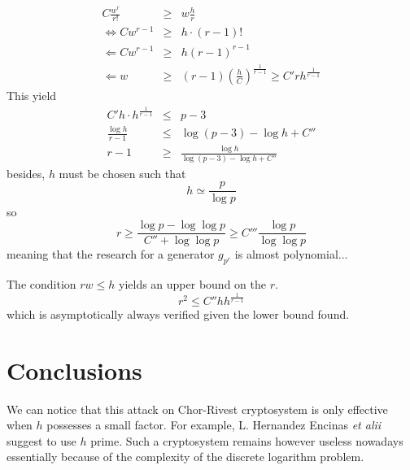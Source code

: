 \documentclass[12pt,a4paper,titlepage]{article}
\begin{document}
\begin{eqnarray*}
C\frac{w^r}{r!} &\geq& w \frac{h}{r} \\
\Leftrightarrow C w^{r-1} &\geq& h\cdot (r-1)! \\
\Leftarrow C w^{r-1} &\geq& h (r-1)^{r-1} \\
\Leftarrow w &\geq& (r-1) \left(\frac{h}{C}\right)^{\frac{1}{r-1}} \geq C' r h^{\frac{1}{r-1}}
\end{eqnarray*}
This yield
\begin{eqnarray*}
C' h \cdot h^{\frac{1}{r-1}} &\leq& p-3 \\
\frac{\log h}{r-1} &\leq& \log (p-3) - \log h + C'' \\
r-1 &\geq& \frac{\log h}{\log(p-3) - \log h + C''} 
\end{eqnarray*}
besides, $h$ must be chosen such that
$$ h \simeq \frac{p}{\log p}$$
so
$$ r \geq \frac{\log p - \log \log p}{C'' + \log \log p} \geq C''' \frac{\log p}{\log\log p}$$
meaning that the research for a generator $g_{p^r}$ is almost polynomial...

The condition $r w \leq h$ yields an upper bound on the $r$.
$$ r^2 \leq C'' h h^{\frac{1}{r-1}} $$
which is asymptotically always verified given the lower bound found.



\section{Conclusions}

We can notice that this attack on Chor-Rivest cryptosystem is only effective when $h$ possesses a small factor. For example, L. Hernandez Encinas \textit{et alii} \cite{Enc04} suggest to use $h$ prime. Such a cryptosystem remains however useless nowadays essentially because of the complexity of the discrete logarithm problem.







\newpage
\appendix
\end{document}
